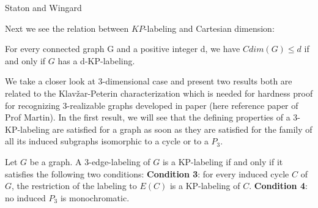 \documentclass[12pt,a4paper,titlepage,openany]{report}
\begin{document}
Staton and Wingard

Next we see the relation between $KP$-labeling and Cartesian dimension:
 \begin{theorem}\label{cdim<kp}
For every connected graph G and a positive integer d, we have $Cdim(G) \leq d$ if and only if $G$ has a d-KP-labeling.
\end{theorem}

We take a closer look at 3-dimensional case and present two results both are related to the Klav\v zar-Peterin characterization which is needed for hardness proof for recognizing 3-realizable graphs developed in paper (here reference paper of Prof Martin).\newline
In the first result, we will see that the defining properties of a 3-KP-labeling are satisfied for a graph as soon as they are satisfied for the family of all its induced subgraphs isomorphic to a cycle or to a $P_3$.

\begin{theorem}\label{3-edge-label}
Let $G$ be a graph. A 3-edge-labeling of $G$ is a KP-labeling if and only if it satisfies the following two conditions:\newline
\textbf{Condition 3}: for every induced cycle $C$ of $G$, the restriction of the labeling to $E(C)$ is
a KP-labeling of $C$.\newline
\textbf{Condition 4}: no induced $P_3$ is monochromatic.
\end{theorem}
\end{document}

